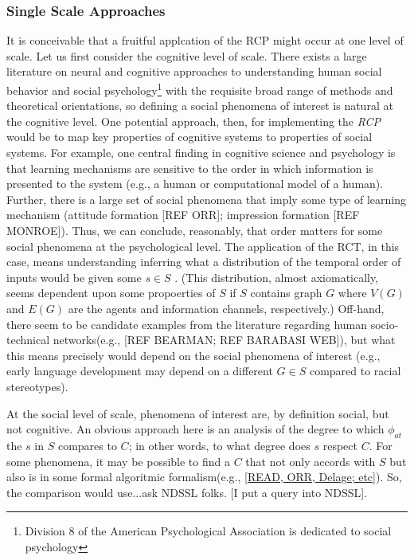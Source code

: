 \documentclass{article}
\begin{document}
\subsubsection{Single Scale Approaches}
It is conceivable that a fruitful applcation of the RCP might occur at one level of scale.  Let us first consider the cognitive level of scale.  There exists a large literature on neural and cognitive approaches to understanding human social behavior and social psychology\footnote{Division 8 of the American Psychological Association is dedicated to social psychology} with the requisite broad range of methods and theoretical orientations, so defining a social phenomena of interest is natural at the cognitive level. One potential approach, then, for implementing the \textit{RCP} would be to map key properties of cognitive systems to properties of social systems.  For example, one central finding in cognitive science and psychology is that learning mechanisms are sensitive to the order in which information is presented to the system (e.g., a human or computational model of a human).  Further, there is a large set of social phenomena that imply some type of learning mechanism (attitude formation [REF ORR]; impression formation [REF MONROE]).  Thus, we can conclude, reasonably, that order matters for some social phenomena at the psychological level.  The application of the RCT, in this case, means understanding inferring what a distribution of the temporal order of inputs would be given some $s \in S$ . (This distribution, almost axiomatically, seems dependent upon some propoerties of $S$ if $S$ contains graph $G$ where $V(G)$ and $E(G)$ are the agents and information channels, respectively.)  Off-hand, there seem to be candidate examples from the literature regarding human socio-technical networks(e.g., [REF BEARMAN; REF BARABASI WEB]), but what this means precisely would depend on the social phenomena of interest (e.g., early language development may depend on a different $G \in S$ compared to racial stereotypes).

At the social level of scale, phenomena of interest are, by definition social, but not cognitive.  An obvious approach here is an analysis of the degree to which $\phi_{at}$ the $s$ in $S$ compares to $C$; in other words, to what degree does $s$ respect $C$.  For some phenomena, it may be possible to find a $C$ that not only accords with $S$ but also is in some formal algoritmic formalism(e.g., \ref{READ, ORR, Delage; etc}).  So, the comparison would use...ask NDSSL folks.  [I put a query into NDSSL]. 
\end{document}
